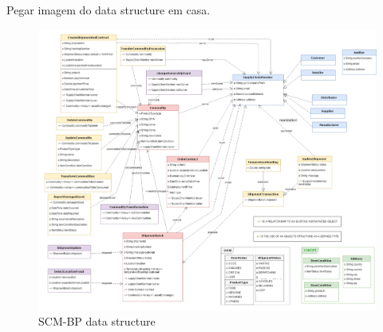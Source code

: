 
{\color{red} Pegar imagem do data structure em casa.}
\begin{figure}[htbp]
\begin{center}
  \includegraphics[scale=0.95]{images/classDiagram.png}
\caption{\ac{SCM-BP} data structure}
\label{fig:dataStructure}
\end{center}
\end{figure}